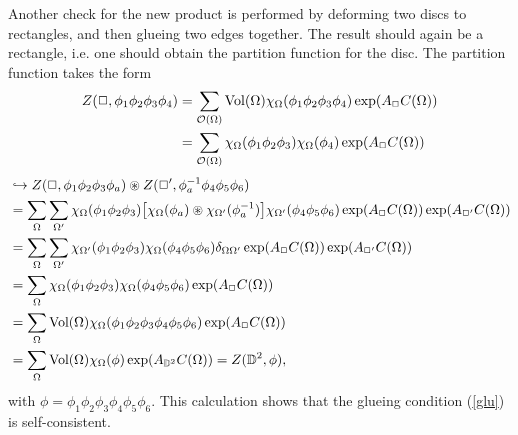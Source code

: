 \documentclass[a4paper,twoside,11pt]{article}
\numberwithin{equation}{section}
\begin{document}
Another check for the new product is performed by deforming two discs to rectangles, and then glueing two edges together. 
The result should again be a rectangle, i.e. one should obtain the partition function 
for the disc. The partition function takes the form
\begin{align}
Z(\Box,\phi_1\phi_2\phi_3\phi_4)&=
\sum_{\mathcal{O}(\Omega)}{\rm Vol}(\Omega)\chi_{\Omega}
(\phi_1\phi_2\phi_3\phi_4)\exp(A_{\Box}C(\Omega))\notag\\
&= \sum_{\mathcal{O}(\Omega)}\chi_{\Omega}(\phi_1\phi_2\phi_3)\chi_\Omega(\phi_4)
\exp(A_{\Box}C(\Omega))
\end{align}
\begin{align}
&\hookrightarrow Z(\Box,\phi_1\phi_2\phi_3\phi_a)\circledast Z(\Box',\phi_a^{-1}\phi_4\phi_5\phi_6)\notag\\ 
&=\sum\limits_\Omega\sum\limits_{\Omega^\prime}\chi_\Omega(\phi_1\phi_2\phi_3)
\bigl[\chi_\Omega(\phi_a)\circledast\chi_{\Omega'}(\phi_a^{-1})\bigr]\chi_{\Omega'}(\phi_4\phi_5\phi_6)\exp(A_{\Box}C(\Omega))\exp(A_{\Box'}C(\Omega))\notag\\
&= \sum\limits_\Omega\sum\limits_{\Omega^\prime}\chi_{\Omega^\prime}(\phi_1\phi_2\phi_3)
\chi_\Omega(\phi_4\phi_5\phi_6)\delta_{\Omega\Omega'}\exp(A_{\Box}C(\Omega))\exp(A_{\Box'}C(\Omega))
\notag\\
&= \sum_\Omega\chi_\Omega(\phi_1\phi_2\phi_3)\chi_\Omega(\phi_4\phi_5\phi_6)\exp(A_{\Box}C(\Omega))\notag\\
&= \sum\limits_\Omega \text{Vol}(\Omega)\chi_\Omega(\phi_1\phi_2\phi_3\phi_4\phi_5\phi_6)\exp(A_{\Box}C(\Omega))\notag\\
&= \sum\limits_\Omega \text{Vol}(\Omega)\chi_\Omega(\phi)\exp(A_{\mathbb{D}^2}C(\Omega))=
Z(\mathbb{D}^2,\phi),
\end{align}
with $\phi=\phi_1\phi_2\phi_3\phi_4\phi_5\phi_6$. This calculation shows that the glueing condition 
(\ref{glu}) is self-consistent.
%
%
\end{document}
